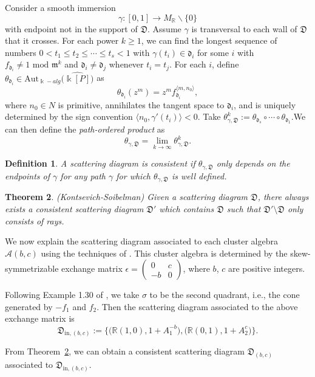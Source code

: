 \documentclass[12pt]{amsart}
\newtheorem{theorem}{Theorem}[section]
\newtheorem{defn}[theorem]{Definition}
\theoremstyle{remark}
\newcommand{\RR}{\mathbb{R}}
\newcommand{\cA}{\mathcal{A}}
\newcommand{\dd}{\mathfrak{d}}
\newcommand{\DD}{\mathfrak{D}}
\newcommand{\fom}{\mathfrak{m}}
\begin{document}
Consider a smooth immersion
\[  \gamma: [0,1] \rightarrow M_{\mathbb{R}} \backslash  \{0 \}  \]
with endpoint not in the support of $\DD$. Assume $\gamma$ is transversal to each wall of $\DD$ that it crosses. For each power $k \geq 1$, we can find the
longest sequence of numbers
$ 0< t_1 \leq t_2 \leq \cdots \leq t_s < 1 $ with $\gamma(t_i)\in\dd_i$
for some $i$ with
$f_{\dd_i} \neq 1 \text{ mod } \fom^k   $ and $\dd_i\not=\dd_j$ whenever
$t_i=t_j$. For each $i$, define $\theta_{\dd_i}\in {\mathrm{Aut}}_{\Bbbk-alg}\big(
\widehat{\Bbbk[P]}\big)$ as
\[\theta_{\dd_i} (z^m) = z^m f_{\dd_i}^{\langle m, n_0 \rangle }, \]
where $n_0 \in N$ is primitive, annihilates the tangent space to $\dd_i$, and is uniquely determined by the sign convention $ \langle n_0, \gamma'(t_i) \rangle <0$. 
Take $\theta^k_{\gamma, \DD} := \theta_{\dd_s} \circ  \cdots \circ \theta_{\dd_1}$.We can then define the \textit{path-ordered product} as
\[\theta_{\gamma, \DD} = \lim_{k \rightarrow \infty} \theta ^k_{\gamma, \DD}. \]

\begin{defn}
A scattering diagram is \emph{consistent} if $\theta _{\gamma, \DD}$ only depends on the endpoints of $\gamma$ for any path $\gamma$ for which $\theta _{\gamma, \DD}$ is well defined.
\end{defn}

\begin{theorem}(Kontsevich-Soibelman) \label{KS}
Given a scattering diagram $\DD$, there always exists a consistent scattering diagram $\DD'$ which contains $\DD$ such that $\DD'\setminus\DD$ only consists of
rays.
\end{theorem}


We now explain the scattering diagram associated to each cluster algebra 
$\cA (b,c)$ using the techniques of \cite{GHKK}. 
This cluster algebra is determined by the skew-symmetrizable exchange matrix
$\epsilon = \begin{pmatrix} 0 & c\\ -b & 0\end{pmatrix}$,
where $b$, $c$ are positive integers. 

Following Example 1.30 of \cite{GHKK}, we take
$\sigma$ to be the second quadrant, i.e., the cone generated by $-f_1$ and
$f_2$. Then the scattering diagram associated
to the above exchange matrix is
\[\DD_{\mathrm{in},(b,c)} := \big\{\big( \RR(1,0), 1+A_1^{-b}\big), \big(\RR(0,1), 
1+A_2^c\big) \big\}.\]

From Theorem~\ref{KS}, we can obtain a consistent scattering diagram $\DD_{(b,c)}$ 
associated to $\DD_{\mathrm{in},(b,c)}$.
\end{document}
